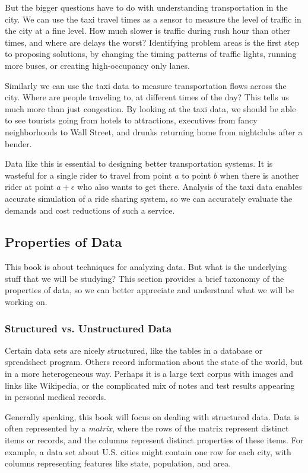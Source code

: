 \documentclass[10pt]{article}
\begin{document}
But the bigger questions have to do with understanding transportation in the city. We can use the taxi travel times as a sensor to measure the level of traffic in the city at a fine level. How much slower is traffic during rush hour than other times, and where are delays the worst? Identifying problem areas is the first step to proposing solutions, by changing the timing patterns of traffic lights, running more buses, or creating high-occupancy only lanes.

Similarly we can use the taxi data to measure transportation flows across the city. Where are people traveling to, at different times of the day? This tells us much more than just congestion. By looking at the taxi data, we should be able to see tourists going from hotels to attractions, executives from fancy neighborhoods to Wall Street, and drunks returning home from nightclubs after a bender.

Data like this is essential to designing better transportation systems. It is wasteful for a single rider to travel from point \(a\) to point \(b\) when there is another rider at point \(a+\epsilon\) who also wants to get there. Analysis of the taxi data enables accurate simulation of a ride sharing system, so we can accurately evaluate the demands and cost reductions of such a service.

\subsection{Properties of Data}
This book is about techniques for analyzing data. But what is the underlying stuff that we will be studying? This section provides a brief taxonomy of the properties of data, so we can better appreciate and understand what we will be working on.

\subsubsection{Structured vs. Unstructured Data}
Certain data sets are nicely structured, like the tables in a database or spreadsheet program. Others record information about the state of the world, but in a more heterogeneous way. Perhaps it is a large text corpus with images and links like Wikipedia, or the complicated mix of notes and test results appearing in personal medical records.

Generally speaking, this book will focus on dealing with structured data. Data is often represented by a \textit{matrix}, where the rows of the matrix represent distinct items or records, and the columns represent distinct properties of these items. For example, a data set about U.S. cities might contain one row for each city, with columns representing features like state, population, and area.
\end{document}
